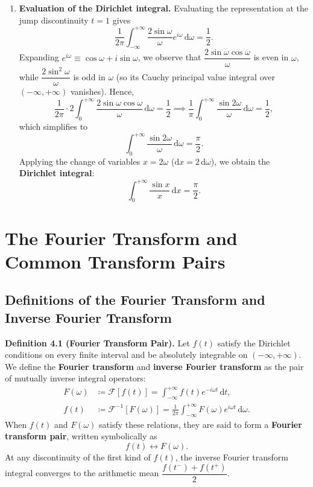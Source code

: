 \documentclass[11pt,a4paper]{article}
\theoremstyle{definition}
\theoremstyle{plain}
\begin{document}
\begin{enumerate}
\item \textbf{Evaluation of the Dirichlet integral.} Evaluating the representation at the jump discontinuity $t = 1$ gives
\begin{equation}
\frac{1}{2\pi} \int_{-\infty}^{+\infty} \frac{2\sin \omega}{\omega} e^{i\omega} \, \mathrm{d}\omega = \frac{1}{2}.
\end{equation}
Expanding $e^{i\omega} \equiv \cos \omega + i\sin \omega$, we observe that $\dfrac{2\sin \omega \cos \omega}{\omega}$ is even in $\omega$, while $\dfrac{2\sin^2 \omega}{\omega}$ is odd in $\omega$ (so its Cauchy principal value integral over $(-\infty, +\infty)$ vanishes). Hence,
\begin{equation}
\frac{1}{2\pi} \cdot 2 \int_{0}^{+\infty} \frac{2\sin \omega \cos \omega}{\omega} \, \mathrm{d}\omega = \frac{1}{2} \implies \frac{1}{\pi} \int_{0}^{+\infty} \frac{\sin 2\omega}{\omega} \, \mathrm{d}\omega = \frac{1}{2},
\end{equation}
which simplifies to
\begin{equation}
\int_{0}^{+\infty} \frac{\sin 2\omega}{\omega} \, \mathrm{d}\omega = \frac{\pi}{2}.
\end{equation}
Applying the change of variables $x = 2\omega$ ($\mathrm{d}x = 2\,\mathrm{d}\omega$), we obtain the \textbf{Dirichlet integral}:
\begin{equation}
\int_{0}^{+\infty} \frac{\sin x}{x} \, \mathrm{d}x = \frac{\pi}{2}.
\end{equation}
\end{enumerate}

\section{The Fourier Transform and Common Transform Pairs}

\subsection{Definitions of the Fourier Transform and Inverse Fourier Transform}

\textbf{Definition 4.1 (Fourier Transform Pair).} Let $f(t)$ satisfy the Dirichlet conditions on every finite interval and be absolutely integrable on $(-\infty, +\infty)$. We define the \textbf{Fourier transform} and \textbf{inverse Fourier transform} as the pair of mutually inverse integral operators:
\begin{align}
F(\omega) &\coloneqq \mathcal{F}[f(t)] = \int_{-\infty}^{+\infty} f(t) e^{-i\omega t} \, \mathrm{d}t, \\
f(t) &\coloneqq \mathcal{F}^{-1}[F(\omega)] = \frac{1}{2\pi} \int_{-\infty}^{+\infty} F(\omega) e^{i\omega t} \, \mathrm{d}\omega.
\end{align}
When $f(t)$ and $F(\omega)$ satisfy these relations, they are said to form a \textbf{Fourier transform pair}, written symbolically as
\begin{equation}
f(t) \longleftrightarrow F(\omega).
\end{equation}
At any discontinuity of the first kind of $f(t)$, the inverse Fourier transform integral converges to the arithmetic mean $\dfrac{f(t^-) + f(t^+)}{2}$.
\end{document}
